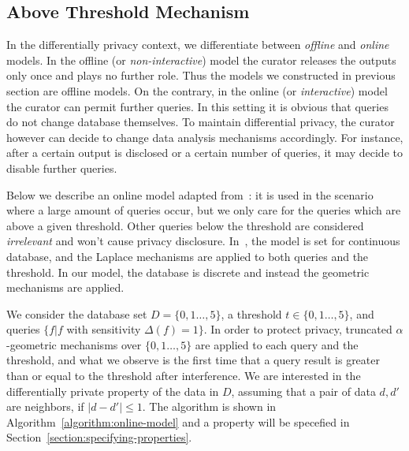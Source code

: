 \subsection{Above Threshold Mechanism}
\label{subsec:threshold}
In the differentially privacy context, we differentiate between \emph{offline} and \emph{online} models.
In the offline (or \emph{non-interactive}) model the curator releases the outputs only once and plays no further role. Thus the models we constructed in previous section are offline models. On the contrary, in the online (or \emph{interactive}) model the curator can permit further queries. In this setting it is obvious that queries do not change database themselves. To maintain differential privacy, the curator however can decide to change data analysis mechanisms accordingly. For instance, after a certain output is disclosed or a certain number of queries, it may decide to disable further queries.

Below we describe an online model adapted from~\cite{DR:14:AFDP}: it is used in the scenario where a large amount of queries occur, but we only care for the queries which
are above a given threshold. Other queries below the threshold are considered \emph{irrelevant} and won't cause privacy disclosure. In~\cite{DR:14:AFDP}, the model is set for continuous database, and the Laplace mechanisms are applied to both queries and the threshold. In our model, the database is discrete and instead the geometric mechanisms are applied.

We consider the database set $D = \{0,1\ldots,5\}$, a threshold $t \in \{0,1\ldots,5\}$, and queries $\{f| f $ with sensitivity $\Delta (f) = 1 \}$. In order to protect privacy, truncated $\alpha$-geometric mechanisms over $\{0,1\ldots,5\}$ are applied to each query and the threshold, and what we observe is the first time that a query result is greater than or equal to the threshold after interference. We are interested in the differentially private property of the data in $D$, assuming that a pair of data $d,d'$are neighbors, if $|d-d'|\le 1$. The algorithm is shown in Algorithm~\ref{algorithm:online-model} and a property will be specefied in Section~\ref{section:specifying-properties}.






